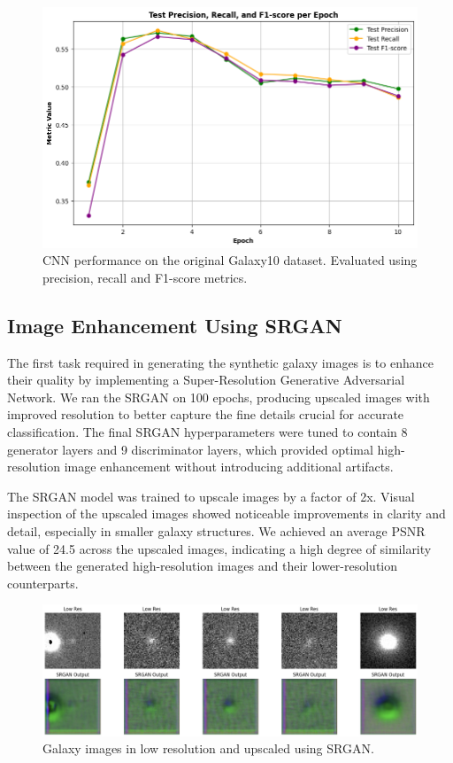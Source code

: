 \documentclass[10pt,twocolumn,letterpaper]{article}
\begin{document}
\begin{figure}[htbp]
    \includegraphics[width=\linewidth]{initial_cnn_metrics.png}
    \caption{CNN performance on the original Galaxy10 dataset. Evaluated using precision, recall and F1-score metrics.}
    \label{fig:initialcnnmet}
  \end{figure}


\subsection{Image Enhancement Using SRGAN}
The first task required in generating the synthetic galaxy images is to enhance their quality by implementing a Super-Resolution Generative Adversarial Network.
We ran the SRGAN on 100 epochs, producing upscaled images with improved resolution to better capture the fine details crucial for accurate classification.
The final SRGAN hyperparameters were tuned to contain 8 generator layers and 9 discriminator layers, which provided optimal high-resolution image enhancement without introducing additional artifacts.

The SRGAN model was trained to upscale images by a factor of 2x. 
Visual inspection of the upscaled images showed noticeable improvements in clarity and detail, especially in smaller galaxy structures. 
We achieved an average PSNR value of 24.5 across the upscaled images, indicating a high degree of similarity between the generated high-resolution images and their lower-resolution counterparts.
\begin{figure}[htbp]
    \includegraphics[width=\linewidth]{srgan.png}
    \caption{Galaxy images in low resolution and upscaled using SRGAN.}
    \label{fig:galaxysrgan}
  \end{figure}
\end{document}
